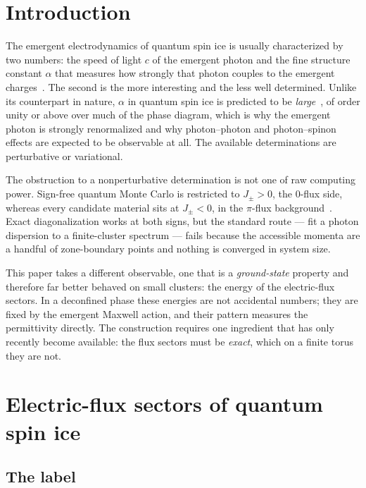 \documentclass[aps,prb,preprint,amsmath,amssymb,superscriptaddress,
longbibliography,floatfix]{revtex4-2}
\newcommand{\Jpm}{J_{\pm}}
\begin{document}
\maketitle

\section{Introduction}

The emergent electrodynamics of quantum spin ice is usually characterized by
two numbers: the speed of light $c$ of the emergent photon and the fine
structure constant $\alpha$ that measures how strongly that photon couples to
the emergent charges~\cite{Hermele2004,Benton2012,Savary2012}.  The second is
the more interesting and the less well determined.  Unlike its counterpart in
nature, $\alpha$ in quantum spin ice is predicted to be
\emph{large}~\cite{Pace2021}, of order unity or above over much of the phase
diagram, which is why the emergent photon is strongly renormalized and why
photon--photon and photon--spinon effects are expected to be observable at all.
The available determinations are perturbative or variational.

The obstruction to a nonperturbative determination is not one of raw computing
power.  Sign-free quantum Monte Carlo is restricted to $\Jpm>0$, the $0$-flux
side, whereas every candidate material sits at $\Jpm<0$, in the $\pi$-flux
background~\cite{Kato2015,Huang2018,Smith2025}.  Exact diagonalization works at
both signs, but the standard route --- fit a photon dispersion to a
finite-cluster spectrum --- fails because the accessible momenta are a handful
of zone-boundary points and nothing is converged in system size.

This paper takes a different observable, one that is a \emph{ground-state}
property and therefore far better behaved on small clusters: the energy of the
electric-flux sectors.  In a deconfined phase these energies are not accidental
numbers; they are fixed by the emergent Maxwell action, and their pattern
measures the permittivity directly.  The construction requires one ingredient
that has only recently become available: the flux sectors must be \emph{exact},
which on a finite torus they are not.

\section{Electric-flux sectors of quantum spin ice}
\label{sec:sectors}

\subsection{The label}
\end{document}
